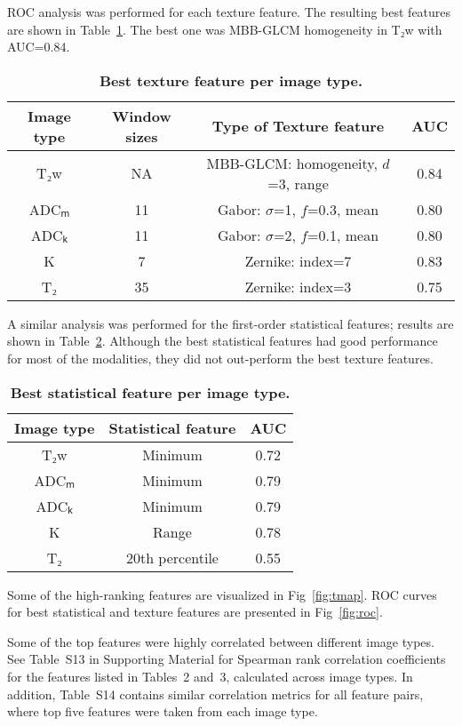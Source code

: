 \documentclass[10pt,letterpaper]{article}
\begin{document}
ROC analysis was performed for each texture feature. The resulting best features
are shown in Table~\ref{tab:texture_imagetype}. The best one was MBB-GLCM
homogeneity in T₂w with AUC=0.84.

\begin{table}[!h]
\centering
\caption{{\bf Best texture feature per image type.}}%
\label{tab:texture_imagetype}

\begin{tabular}{c c c c}
\hline
Image type & Window sizes & Type of Texture feature & AUC \\
\hline
T₂w & NA & MBB-GLCM\@: homogeneity, $d$=3, range & 0.84 \\
ADCₘ & 11 & Gabor: $\sigma$=1, $f$=0.3, mean & 0.80 \\
ADCₖ & 11 & Gabor: $\sigma$=2, $f$=0.1, mean & 0.80 \\
K & 7 & Zernike: index=7 & 0.83 \\
T₂ & 35 & Zernike: index=3 & 0.75 \\
\hline
\end{tabular}
\end{table}

A similar analysis was performed for the first-order statistical features;
results are shown in Table~\ref{tab:stats_imagetype}. Although the best
statistical features had good performance for most of the modalities, they did
not out-perform the best texture features.

\begin{table}[!h]
\centering
\caption{{\bf Best statistical feature per image type.}}%
\label{tab:stats_imagetype}

\begin{tabular}{c c c}
\hline
Image type & Statistical feature & AUC \\
\hline
T₂w & Minimum & 0.72 \\
ADCₘ & Minimum & 0.79 \\
ADCₖ & Minimum & 0.79 \\
K & Range & 0.78 \\
T₂ & 20th percentile & 0.55 \\
\hline
\end{tabular}
\end{table}

Some of the high-ranking features are visualized in Fig~\ref{fig:tmap}. ROC
curves for best statistical and texture features are presented in
Fig~\ref{fig:roc}.

Some of the top features were highly correlated between different image types.
See Table~S13 in Supporting Material for Spearman rank correlation coefficients
for the features listed in Tables~2 and~3, calculated across image types. In
addition, Table~S14 contains similar correlation metrics for all feature pairs,
where top five features were taken from each image type.
\end{document}
